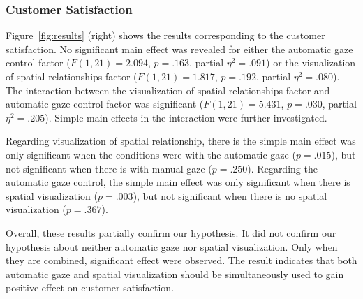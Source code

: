 \documentclass[journal]{IEEEtran}
\begin{document}

\subsubsection{Customer Satisfaction}
Figure~\ref{fig:results} (right) shows the results corresponding to the customer satisfaction.
No significant main effect was revealed for either the automatic gaze control factor ($F(1,21)=2.094$, $p=.163$, partial $\eta^2=.091$) or the visualization of spatial relationships factor ($F(1,21)=1.817$, $p=.192$, partial $\eta^2=.080$).
The interaction between the visualization of spatial relationships factor and automatic gaze control factor was significant ($F(1,21)=5.431$, $p=.030$, partial $\eta^2=.205$).
Simple main effects in the interaction were further investigated.

Regarding visualization of spatial relationship, there is the simple main effect was only significant when the conditions were with the automatic gaze ($p=.015$), but not significant when there is with manual gaze ($p=.250$). 
Regarding the automatic gaze control, the simple main effect was only significant when there is spatial visualization ($p=.003$), but not significant when there is no spatial visualization ($p=.367$).

Overall, these results partially confirm our hypothesis. 
It did not confirm our hypothesis about neither automatic gaze nor spatial visualization. 
Only when they are combined, significant effect were observed. 
The result indicates that both automatic gaze and spatial visualization should be simultaneously used to gain positive effect on customer satisfaction.
\end{document}
